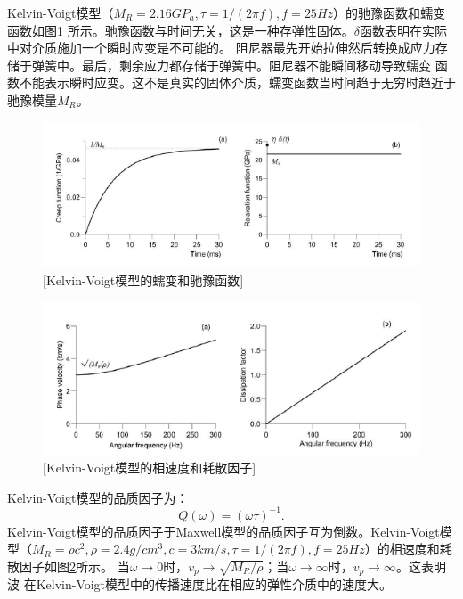 Kelvin-Voigt模型（$M_R=2.16GP_a,\tau=1/(2\pi f),f=25Hz$）的驰豫函数和蠕变函数如图\ref{fig:kelvin_creep}
所示。驰豫函数与时间无关，这是一种存弹性固体。$\delta$函数表明在实际中对介质施加一个瞬时应变是不可能的。
阻尼器最先开始拉伸然后转换成应力存储于弹簧中。最后，剩余应力都存储于弹簧中。阻尼器不能瞬间移动导致蠕变
函数不能表示瞬时应变。这不是真实的固体介质，蠕变函数当时间趋于无穷时趋近于驰豫模量$M_R$。
\begin{figure}[!htbp]
	    \centering
		\includegraphics[width=0.9\linewidth]{figure/kelvin_creep}
		[Kelvin-Voigt模型的蠕变和驰豫函数]
		\label{fig:kelvin_creep}
\end{figure}
\begin{figure}[!htbp]
	    \centering
		\includegraphics[width=0.8\linewidth]{figure/kelvin_vp}
		[Kelvin-Voigt模型的相速度和耗散因子]
		\label{fig:kelvin_vp}
\end{figure}
Kelvin-Voigt模型的品质因子为：
\begin{equation}
	Q(\omega)=(\omega\tau)^{-1}.
\end{equation}
Kelvin-Voigt模型的品质因子于Maxwell模型的品质因子互为倒数。Kelvin-Voigt模型（$M_R=\rho c^2,
\rho=2.4g/cm^3,c=3km/s,\tau=1/(2\pi f),f=25Hz $）的相速度和耗散因子如图\ref{fig:kelvin_vp}所示。
当$\omega\to0$时，$v_p\to\sqrt{M_R/\rho}$；当$\omega\to\infty$时，$v_p\to\infty$。这表明波
在Kelvin-Voigt模型中的传播速度比在相应的弹性介质中的速度大。


